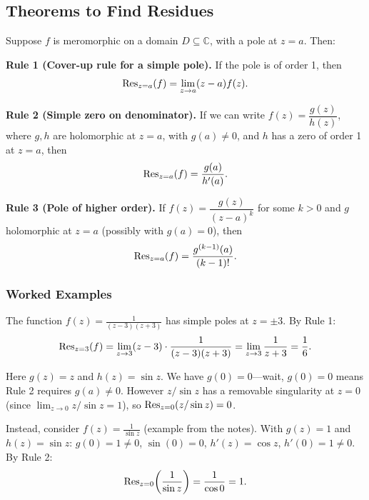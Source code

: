 \documentclass[11pt, a4paper]{article}
\begin{document}
\subsection*{Theorems to Find Residues}

\begin{thmbox}
Suppose $f$ is meromorphic on a domain $D\subseteq\mathbb{C}$, with a pole at $z=a$. Then:

\medskip
\textbf{Rule 1 (Cover-up rule for a simple pole).}
If the pole is of order 1, then
\[
  \operatorname{Res}_{z=a}(f) = \lim_{z\to a}(z-a)f(z).
\]

\medskip
\textbf{Rule 2 (Simple zero on denominator).}
If we can write $f(z)=\dfrac{g(z)}{h(z)}$, where $g,h$ are holomorphic at $z=a$, with $g(a)\neq 0$, and $h$ has a zero of order 1 at $z=a$, then
\[
  \operatorname{Res}_{z=a}(f) = \frac{g(a)}{h'(a)}.
\]

\medskip
\textbf{Rule 3 (Pole of higher order).}
If $f(z)=\dfrac{g(z)}{(z-a)^k}$ for some $k>0$ and $g$ holomorphic at $z=a$ (possibly with $g(a)=0$), then
\[
  \operatorname{Res}_{z=a}(f) = \frac{g^{(k-1)}(a)}{(k-1)!}.
\]
\end{thmbox}

\subsubsection*{Worked Examples}

\begin{exbox}[Rule 1 --- Find $\Res_{z=3}\!\left(\frac{1}{z^2-9}\right)$ (from the notes)]
The function $f(z)=\frac{1}{(z-3)(z+3)}$ has simple poles at $z=\pm 3$. By Rule 1:
\[
  \operatorname{Res}_{z=3}(f) = \lim_{z\to 3}(z-3)\cdot\frac{1}{(z-3)(z+3)} = \lim_{z\to 3}\frac{1}{z+3} = \frac{1}{6}.
\]
\end{exbox}

\begin{exbox}[Rule 2 --- Find $\Res_{z=0}\!\left(\frac{z}{\sin z}\right)$ (from the notes)]
Here $g(z)=z$ and $h(z)=\sin z$. We have $g(0)=0$---wait, $g(0)=0$ means Rule 2 requires $g(a)\neq 0$. However $z/\sin z$ has a removable singularity at $z=0$ (since $\lim_{z\to 0}z/\sin z=1$), so $\operatorname{Res}_{z=0}(z/\sin z)=0$.

Instead, consider $f(z)=\frac{1}{\sin z}$ (example from the notes). With $g(z)=1$ and $h(z)=\sin z$:
$g(0)=1\neq 0$, $\sin(0)=0$, $h'(z)=\cos z$, $h'(0)=1\neq 0$. By Rule 2:
\[
  \operatorname{Res}_{z=0}\!\left(\frac{1}{\sin z}\right) = \frac{1}{\cos 0} = 1.
\]
\end{exbox}
\end{document}
